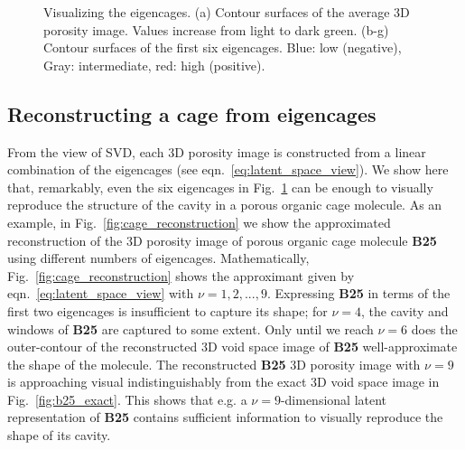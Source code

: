 \documentclass[journal=jacsat,manuscript=article,layout=traditional]{achemso}
\begin{document}
\begin{figure}
		\qquad
	\caption{Visualizing the eigencages. (a) Contour surfaces of the average 3D porosity image. {\color{red} Values increase from light to dark green.} (b-g) Contour surfaces of the first six eigencages. Blue: low (negative), Gray: intermediate, red: high (positive).
	} \label{fig:eigencages}
\end{figure}

\subsection{Reconstructing a cage from eigencages} From the view of SVD, each 3D porosity image is constructed from a linear combination of the eigencages (see eqn.~\ref{eq:latent_space_view}). We show here that, remarkably, even the six eigencages in Fig.~\ref{fig:eigencages} can be enough to visually reproduce the structure of the cavity in a porous organic cage molecule. As an example, in Fig.~\ref{fig:cage_reconstruction} we show the approximated reconstruction of the 3D porosity image of porous organic cage molecule \textbf{B25} using different numbers of eigencages. Mathematically, Fig.~\ref{fig:cage_reconstruction} shows the approximant given by eqn.~\ref{eq:latent_space_view} with $\nu=1,2,...,9$. Expressing \textbf{B25} in terms of the first two eigencages is insufficient to capture its shape; for $\nu=4$, the cavity and windows of \textbf{B25} are captured to some extent. Only until we reach $\nu=6$ does the outer-contour of the reconstructed 3D void space image of \textbf{B25} well-approximate the shape of the molecule. The reconstructed \textbf{B25} 3D porosity image with $\nu=9$ is approaching visual indistinguishably from the exact 3D void space image in Fig.~\ref{fig:b25_exact}. This shows that e.g. a $\nu=9$-dimensional latent representation of \textbf{B25} contains sufficient information to visually reproduce the shape of its cavity.
\end{document}
